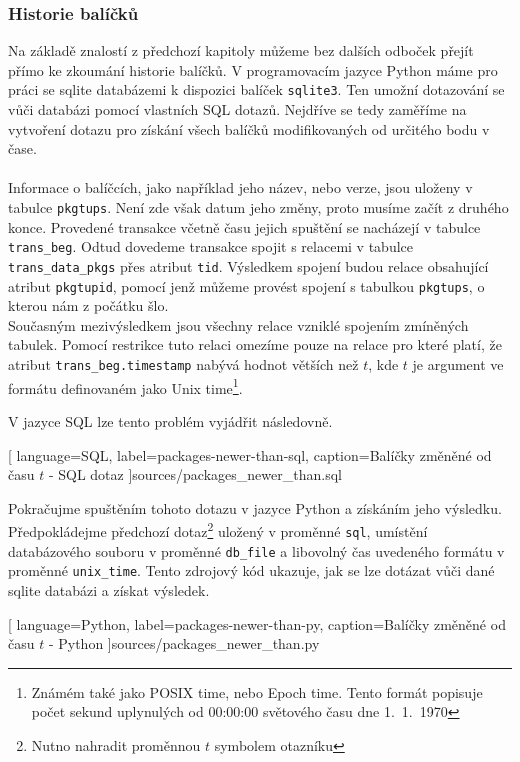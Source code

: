 \documentclass[
  field=inf,
  biblatex,
  glossaries,
  index
]{kidiplom}
\begin{document}
		\subsubsection{Historie balíčků}
		Na základě znalostí z předchozí kapitoly můžeme bez dalších odboček přejít přímo ke zkoumání historie balíčků. V programovacím jazyce Python máme pro práci se sqlite databázemi k dispozici balíček \texttt{sqlite3}. Ten umožní dotazování se vůči databázi pomocí vlastních SQL dotazů. Nejdříve se tedy zaměříme na vytvoření dotazu pro získání všech balíčků modifikovaných od určitého bodu v čase.
		\\
		\\
		Informace o balíčcích, jako například jeho název, nebo verze, jsou uloženy v tabulce \texttt{pkgtups}. Není zde však datum jeho změny, proto musíme začít z druhého konce. Provedené transakce včetně času jejich spuštění se nacházejí v tabulce \texttt{trans\_beg}. Odtud dovedeme transakce spojit s relacemi v tabulce \texttt{trans\_data\_pkgs} přes atribut \texttt{tid}. Výsledkem spojení budou relace obsahující atribut \texttt{pkgtupid}, pomocí jenž můžeme provést spojení s tabulkou \texttt{pkgtups}, o kterou nám z počátku šlo.
		\\
		Současným mezivýsledkem jsou všechny relace vzniklé spojením zmíněných tabulek. Pomocí restrikce tuto relaci omezíme pouze na relace pro které platí, že atribut \texttt{trans\_beg.timestamp} nabývá hodnot větších než $t$, kde $t$ je argument ve formátu definovaném jako Unix time\footnote{Známém také jako POSIX time, nebo Epoch time. Tento formát popisuje počet sekund uplynulých od 00:00:00 světového času dne 1.~1.~1970}.

		V jazyce SQL lze tento problém vyjádřit následovně.

		
		[
			language=SQL,
			label=packages-newer-than-sql,
			caption={Balíčky změněné od času $t$ - SQL dotaz}
		]{sources/packages_newer_than.sql}

		Pokračujme spuštěním tohoto dotazu v jazyce Python a získáním jeho výsledku. Předpokládejme předchozí dotaz\footnote{Nutno nahradit proměnnou $t$ symbolem otazníku} uložený v proměnné \texttt{sql}, umístění databázového souboru v proměnné \texttt{db\_file} a libovolný čas uvedeného formátu v proměnné \texttt{unix\_time}. Tento zdrojový kód ukazuje, jak se lze dotázat vůči dané sqlite databázi a získat výsledek.

		
		[
			language=Python,
			label=packages-newer-than-py,
			caption={Balíčky změněné od času $t$ - Python}
		]{sources/packages_newer_than.py}
\end{document}

